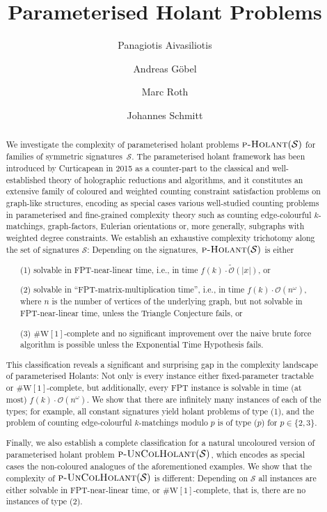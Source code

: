 \documentclass[authorcolumns,numberwithinsect]{no-lipics-v2022}
\title{Parameterised Holant Problems}
\author{Panagiotis Aivasiliotis}{Hasso Plattner Institute, University of Potsdam}{panos.aivasiliotis@hpi.de}{}{}
\author{Andreas Göbel}{Hasso Plattner Institute, University of Potsdam}{andreas.goebel@hpi.de}{}{}
\author{Marc Roth}{School of Electronic Engineering and Computer Science, Queen Mary University of London}{m.roth@qmul.ac.uk}{}{}
\author{Johannes Schmitt}{Department of Mathematics, ETH Zürich}{johannes.schmitt@math.ethz.ch}{}{}
\newcommand{\W}{\mathrm{W}}
\begin{document}
\maketitle

\begin{abstract}
    We investigate the complexity of parameterised holant problems $\textsc{p-Holant}(\mathcal{S})$ for families of symmetric signatures~$\mathcal{S}$. The parameterised holant framework has been introduced by Curticapean in 2015 as a counter-part to the classical and well-established theory of holographic reductions and algorithms, and it constitutes an extensive family of coloured and weighted counting constraint satisfaction problems on graph-like structures, encoding as special cases various well-studied counting problems in parameterised and fine-grained complexity theory such as counting edge-colourful $k$-matchings, graph-factors, Eulerian orientations or, more generally, subgraphs with weighted degree constraints. We establish an exhaustive complexity trichotomy along the set of signatures $\mathcal{S}$: Depending on the signatures, $\textsc{p-Holant}(\mathcal{S})$ is either
    \begin{itemize}
        \item[(1)] solvable in FPT-near-linear time, i.e., in time $f(k)\cdot \tilde{\mathcal{O}}(|x|)$, or
        \item[(2)] solvable in ``FPT-matrix-multiplication time'', i.e., in time $f(k)\cdot {\mathcal{O}}(n^{\omega})$, where $n$ is the number of vertices of the underlying graph, but not solvable in FPT-near-linear time, unless the Triangle Conjecture fails, or
        \item[(3)] $\#\W[1]$-complete and no significant improvement over the naive brute force algorithm is possible unless the Exponential Time Hypothesis fails. 
    \end{itemize}
    This classification reveals a significant and surprising gap in the complexity landscape of parameterised Holants: Not only is every instance either fixed-parameter tractable or $\#\W[1]$-complete, but additionally, every FPT instance is solvable in time (at most) $f(k)\cdot {\mathcal{O}}(n^{\omega})$. 
    We show that there are infinitely many instances of each of the types; for example, all constant signatures yield holant problems of type (1), and the problem of counting edge-colourful $k$-matchings modulo $p$ is of type ($p$) for $p\in\{2,3\}$. 

    Finally, we also establish a complete classification for a natural uncoloured version of parameterised holant problem $\textsc{p-UnColHolant}(\mathcal{S})$, which encodes as special cases the non-coloured analogues of the aforementioned examples. We show that the complexity of $\textsc{p-UnColHolant}(\mathcal{S})$ is different: Depending on $\mathcal{S}$ all instances are either solvable in FPT-near-linear time, or $\#\W[1]$-complete, that is, there are no instances of type (2). 
\end{abstract}
\end{document}
